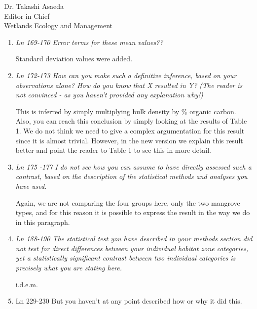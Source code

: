 \documentclass[11pt]{bgcletter}
\begin{document}
\begin{letter}{Dr. Takashi Asaeda\\
 Editor in Chief \\ Wetlands Ecology and Management}
\begin{enumerate}
{\color{blue} Sorry for the confusion. In the ANOVA we didn't compare four categorical zones as the reviewer thought, but only the two groups of mangrove types: fringe and basin. Therefore the Tukey post-hoc test is not needed. However, given in the new version of the manuscript we do not use ANOVA anymore for comparisons of means. Since the data was not normally distributed, we use now a Wilcoxon test to compare the distribution of the data. Description of statistical analyses was changed accordingly in the text. }

\item {\it Ln 169-170 Error terms for these mean values??}

{\color{blue} Standard deviation values were added. }

\item {\it Ln 172-173 How can you make such a definitive inference, based on your observations alone? How do you know that X resulted in Y? (The reader is not convinced - as you haven't provided any explanation why!)}

{\color{blue} This is inferred by simply multiplying bulk density by \% organic carbon. Also, you can reach this conclusion by simply looking at the results of Table 1. We do not think we need to give a complex argumentation for this result since it is almost trivial. However, in the new version we explain this result better and point the reader to Table 1 to see this in more detail. }

\item {\it Ln 175 -177 I do not see how you can assume to have directly assessed such a contrast, based on the description of the statistical methods and analyses you have used.}

{\color{blue} Again, we are not comparing the four groups here, only the two mangrove types, and for this reason it is possible to express the result in the way we do in this paragraph.}

\item {\it Ln 188-190 The statistical test you have described in your methods section did not test for direct differences between your individual habitat zone categories, yet a statistically significant contrast between two individual categories is precisely what you are stating here. }

{\color{blue} i.d.e.m.}

\item Ln 229-230 But you haven't at any point described how or why it did this.


\end{enumerate}
\end{letter}
\end{document}
